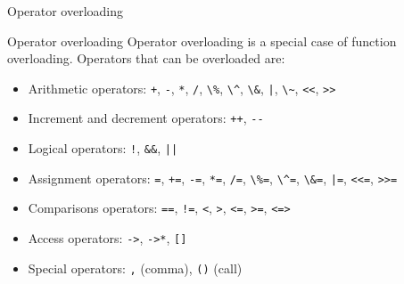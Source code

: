 \begin{frame}{Operator overloading}{}
  \begin{block}{Operator overloading}
    Operator overloading is a special case of function overloading. Operators that can be overloaded are:
    \begin{itemize}
    \item
      Arithmetic operators: \lstinline!+!, \lstinline!-!, \lstinline!*!, \lstinline!/!, \lstinline!\%!, \lstinline!\^!, \lstinline!\&!, \lstinline!|!, \lstinline!\~!, \lstinline!<<!, \lstinline!>>!
    \item
      Increment and decrement operators: \lstinline!++!, \lstinline!--!
    \item
      Logical operators: \lstinline+!+, \lstinline!&&!, \lstinline!||!
    \item
      Assignment operators: \lstinline!=!, \lstinline!+=!, \lstinline!-=!, \lstinline!*=!, \lstinline!/=!, \lstinline!\%=!, \lstinline!\^=!, \lstinline!\&=!, \lstinline!|=!, \lstinline!<<=!, \lstinline!>>=!
    \item
      Comparisons operators: \lstinline!==!, \lstinline+!=+, \lstinline!<!, \lstinline!>!, \lstinline!<=!, \lstinline!>=!, \lstinline!<=>!
    \item
      Access operators: \lstinline!->!, \lstinline!->*!, \lstinline![]!
    \item
      Special operators: \lstinline!,! (comma), \lstinline!()! (call)
    \end{itemize}
  \end{block}
\end{frame}

